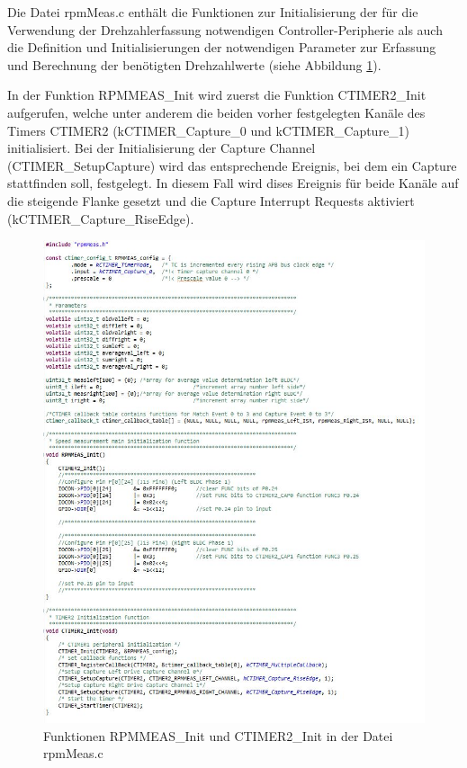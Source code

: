 Die Datei \glqq{}rpmMeas.c\grqq{} enthält die Funktionen zur Initialisierung der für die Verwendung der Drehzahlerfassung notwendigen Controller-Peripherie als auch die Definition und Initialisierungen der notwendigen Parameter zur Erfassung und Berechnung der benötigten Drehzahlwerte (siehe Abbildung \ref{fig:rpmMeasC0}).\vspace{11pt}

In der Funktion RPMMEAS\_Init wird zuerst die Funktion CTIMER2\_Init aufgerufen, welche unter anderem die beiden vorher festgelegten Kanäle des Timers CTIMER2 (\glqq{}kCTIMER\_Capture\_0\grqq{} und \glqq{}kCTIMER\_Capture\_1\grqq{}) initialisiert. Bei der Initialisierung der Capture Channel (CTIMER\_SetupCapture) wird das entsprechende Ereignis, bei dem ein Capture stattfinden soll, festgelegt. In diesem Fall wird dises Ereignis für beide Kanäle auf die steigende Flanke gesetzt und die Capture Interrupt Requests aktiviert (\glqq{}kCTIMER\_Capture\_RiseEdge\grqq{}).

\begin{figure}[H] %
\includegraphics[width=.90\textwidth]{sec4/images/rpmmeas_init_ctimer2_init} 
\centering
\captionsetup{width=.95\textwidth}
\caption[Funktionen RPMMEAS\_Init und CTIMER2\_Init in der Datei \glqq{}rpmMeas.c\grqq{}]{Funktionen RPMMEAS\_Init und CTIMER2\_Init in der Datei \glqq{}rpmMeas.c\grqq{}}\centering
\label{fig:rpmMeasC0}
\end{figure}

